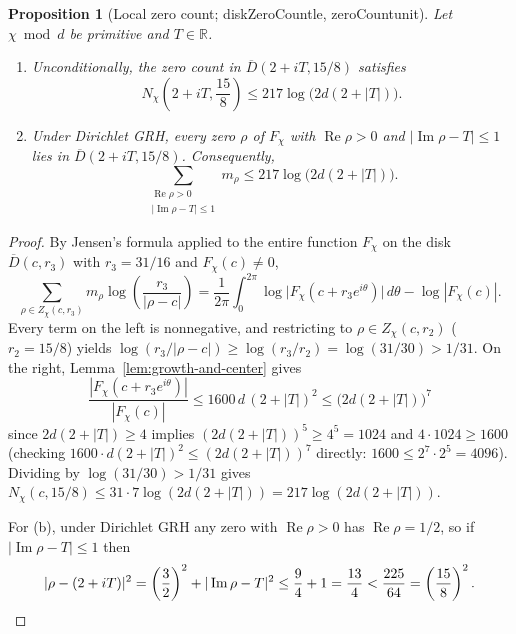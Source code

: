 \documentclass[11pt,reqno]{amsart}
\numberwithin{equation}{section}
\newtheorem{proposition}[theorem]{Proposition}
\theoremstyle{definition}
\newcommand{\R}{\mathbb{R}}
\newcommand{\1}{\mathbf{1}}
\renewcommand{\Re}{\operatorname{Re}}
\renewcommand{\Im}{\operatorname{Im}}
\newcommand{\lean}[1]{{\footnotesize\ttfamily\renewcommand{\_}{\textunderscore\allowbreak}#1}}
\newcommand{\GRH}{\textup{GRH}}
\begin{document}
\begin{proposition}[Local zero count; \lean{diskZeroCount\_le}, \lean{zeroCount\_unit}]
\label{prop:zero-count}
Let $\chi \bmod d$ be primitive and $T \in \R$.
\begin{enumerate}[label=(\alph*)]
  \item Unconditionally, the zero count in $\overline{D}(2+iT, 15/8)$ satisfies
  \begin{equation}\label{eq:disk-zero-count}
    N_\chi\!\left(2+iT, \frac{15}{8}\right) \le 217 \log\bigl(2 d (2 + |T|)\bigr).
  \end{equation}
  \item Under Dirichlet \GRH{}, every zero $\rho$ of $F_\chi$ with $\Re \rho > 0$ and $|\Im \rho - T| \le 1$ lies in $\overline{D}(2+iT, 15/8)$. Consequently,
  \begin{equation}\label{eq:unit-zero-count}
    \sum_{\substack{\Re \rho > 0 \\ |\Im \rho - T| \le 1}} m_\rho \le 217 \log\bigl(2 d (2 + |T|)\bigr).
  \end{equation}
\end{enumerate}
\end{proposition}

\begin{proof}
By Jensen's formula applied to the entire function $F_\chi$ on the disk $\overline{D}(c, r_3)$ with $r_3 = 31/16$ and $F_\chi(c) \neq 0$,
\[
  \sum_{\rho \in Z_\chi(c, r_3)} m_\rho \log\!\left(\frac{r_3}{|\rho - c|}\right)
  = \frac{1}{2\pi}\int_0^{2\pi} \log\bigl|F_\chi(c + r_3 e^{i\theta})\bigr|\,d\theta - \log|F_\chi(c)|.
\]
Every term on the left is nonnegative, and restricting to $\rho \in Z_\chi(c, r_2)$ ($r_2 = 15/8$) yields $\log(r_3/|\rho - c|) \ge \log(r_3/r_2) = \log(31/30) > 1/31$. On the right, Lemma~\ref{lem:growth-and-center} gives
\[
  \frac{|F_\chi(c + r_3 e^{i\theta})|}{|F_\chi(c)|} \le 1600\, d\,(2 + |T|)^2 \le \bigl(2 d (2 + |T|)\bigr)^7
\]
since $2 d (2+|T|) \ge 4$ implies $(2 d(2+|T|))^5 \ge 4^5 = 1024$ and $4 \cdot 1024 \ge 1600$ (checking $1600 \cdot d(2+|T|)^2 \le (2d(2+|T|))^7$ directly: $1600 \le 2^7 \cdot 2^5 = 4096$). Dividing by $\log(31/30) > 1/31$ gives $N_\chi(c, 15/8) \le 31 \cdot 7 \log(2d(2+|T|)) = 217 \log(2d(2+|T|))$.

For (b), under Dirichlet \GRH{} any zero with $\Re \rho > 0$ has $\Re \rho = 1/2$, so if $|\Im \rho - T| \le 1$ then
\[
  |\rho - (2+iT)|^2 = \left(\frac{3}{2}\right)^2 + |\Im \rho - T|^2 \le \frac{9}{4} + 1 = \frac{13}{4} < \frac{225}{64} = \left(\frac{15}{8}\right)^2. \qedhere
\]
\end{proof}
\end{document}
